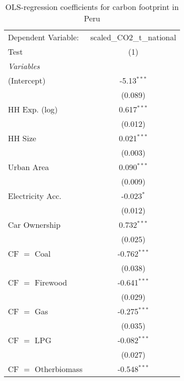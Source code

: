 
\begin{table}[htbp!]
   \centering
   \small
   \begin{adjustbox}{width = 1\textwidth, max height = 0.95\textheight, center}
      \begin{threeparttable}[b]
         \caption{\label{tab:OLS_2_PER} OLS-regression coefficients for carbon footprint in Peru}
         \begin{tabular}{lc}
            \tabularnewline \midrule \midrule
            Dependent Variable: & scaled\_CO2\_t\_national\\     
            Test                & (1)\\  
            \midrule
            \emph{Variables}\\
            (Intercept)         & -5.13$^{***}$\\   
                                & (0.089)\\   
            HH Exp. (log)       & 0.617$^{***}$\\   
                                & (0.012)\\   
            HH Size             & 0.021$^{***}$\\   
                                & (0.003)\\   
            Urban Area          & 0.090$^{***}$\\   
                                & (0.009)\\   
            Electricity Acc.    & -0.023$^{*}$\\   
                                & (0.012)\\   
            Car Ownership       & 0.732$^{***}$\\   
                                & (0.025)\\   
            CF $=$ Coal         & -0.762$^{***}$\\   
                                & (0.038)\\   
            CF $=$ Firewood     & -0.641$^{***}$\\   
                                & (0.029)\\   
            CF $=$ Gas          & -0.275$^{***}$\\   
                                & (0.035)\\   
            CF $=$ LPG          & -0.082$^{***}$\\   
                                & (0.027)\\   
            CF $=$ Otherbiomass & -0.548$^{***}$\\   

\end{tabular}
\end{threeparttable}
\end{adjustbox}
\end{table}
